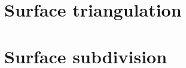 \documentclass[11pt,fleqn]{book} %
\begin{document}
\section{Surface triangulation}
\label{sec:surface_triangulation}

\section{Surface subdivision}
\label{sec:surface_subdivision}




\printindex

\end{document}

